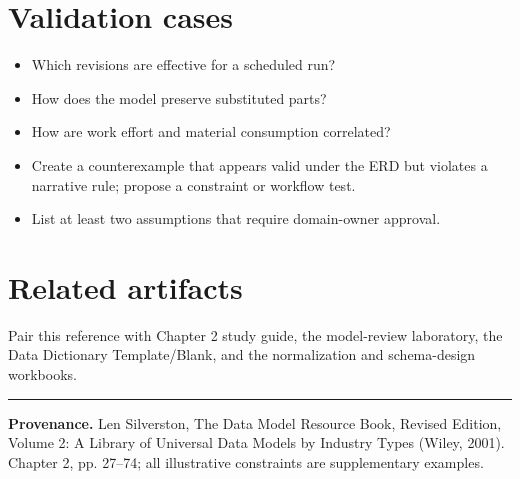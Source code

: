 \documentclass[11pt,letterpaper]{article}
\begin{document}
\section{Validation cases}
\begin{itemize}
\item Which revisions are effective for a scheduled run?
\item How does the model preserve substituted parts?
\item How are work effort and material consumption correlated?
\item Create a counterexample that appears valid under the ERD but violates a narrative rule; propose a constraint or workflow test.
\item List at least two assumptions that require domain-owner approval.
\end{itemize}

\section{Related artifacts}
Pair this reference with Chapter 2 study guide, the model-review laboratory, the Data Dictionary Template/Blank, and the normalization and schema-design workbooks.


\vfill
\hrule
{\footnotesize\textbf{Provenance.} Len Silverston, The Data Model Resource Book, Revised Edition, Volume 2: A Library of Universal Data Models by Industry Types (Wiley, 2001). Chapter 2, pp. 27--74; all illustrative constraints are supplementary examples.}
\end{document}
